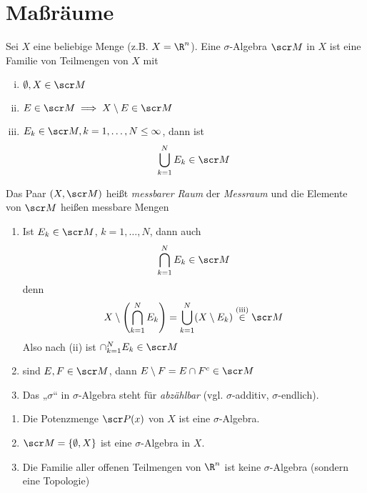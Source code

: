 \documentclass{mycourse}
\begin{document}
\section{Maßräume}


Sei $X$ eine beliebige Menge (z.B. $X=\R^n$).
Eine $\sigma$-Algebra $\scr M$ in $X$ ist eine Familie von Teilmengen von $X$ mit
\begin{enumerate}[(i)]
	\item
		$\emptyset, X \in \scr M$
	\item
		$E \in \scr M \implies X \setminus E \in \scr M$
	\item
		$E_k \in \scr M, k=1,\dotsc, N \le \infty$, dann ist
		\[
			\bigcup_{k=1}^N E_k \in \scr M
		\]
\end{enumerate}
Das Paar $(X,\scr M)$ heißt \emph{messbarer Raum} der \emph{Messraum} und die Elemente von $\scr M$ heißen messbare Mengen

\begin{note}
	\begin{enumerate}[1)]
		\item
			Ist $E_k \in \scr M$, $k=1,\dotsc, N$, dann auch
			\[
				\bigcap_{k=1}^N E_k \in \scr M
			\]
			denn
			\[
				X \setminus \left(\bigcap_{k=1}^N E_k\right) = \bigcup_{k=1}^N (X\setminus E_k) \stackrel{\text{(iii)}} \in \scr M
			\]
			Also nach (ii) ist $\cap_{k=1}^N E_k \in \scr M$
		\item
			sind $E, F \in \scr M$, dann $E \setminus F = E \cap F^c \in \scr M$
		\item
			Das „$\sigma$“ in $\sigma$-Algebra steht für \emph{abzählbar} (vgl. $\sigma$-additiv, $\sigma$-endlich).
	\end{enumerate}
\end{note}


\begin{ex*}
	\begin{enumerate}[1)]
		\item
			Die Potenzmenge $\scr P(x)$ von $X$ ist eine $\sigma$-Algebra.
		\item
			$\scr M = \{\emptyset, X\}$ ist eine $\sigma$-Algebra in $X$.
		\item
			Die Familie aller offenen Teilmengen von $\R^n$ ist keine $\sigma$-Algebra (sondern eine Topologie)
	\end{enumerate}
\end{ex*}
\end{document}
